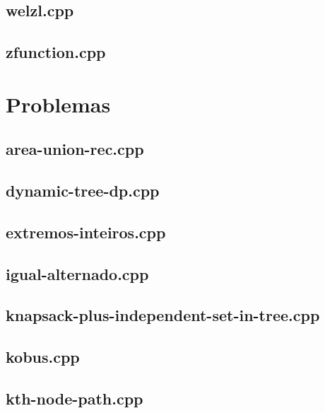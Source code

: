 \documentclass[a4paper,12pt]{article}
\begin{document}
\subsection{welzl.cpp}


\subsection{zfunction.cpp}






\section{Problemas}
\subsection{area-union-rec.cpp}


\subsection{dynamic-tree-dp.cpp}


\subsection{extremos-inteiros.cpp}


\subsection{igual-alternado.cpp}


\subsection{knapsack-plus-independent-set-in-tree.cpp}


\subsection{kobus.cpp}


\subsection{kth-node-path.cpp}

\end{document}
